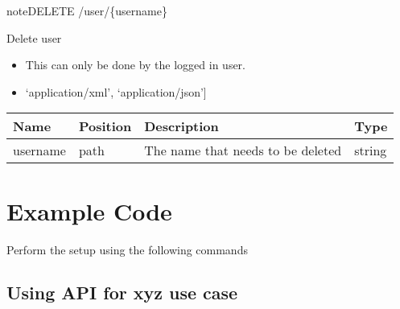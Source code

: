 \documentclass[letterpaper,10pt,english]{sphinxmanual}
\begin{document}
\begin{sphinxadmonition}{note}{DELETE /user/\{username\}}

Delete user\begin{itemize}
\item {} 
This can only be done by the logged in user.

\item {} 
\sphinxstylestrong{Produces: 
}{[}‘application/xml’, ‘application/json’{]}

\end{itemize}




\begin{savenotes}\sphinxattablestart
\centering
\begin{tabulary}{\linewidth}[t]{|T|T|T|T|}
\hline
\sphinxstyletheadfamily 
Name
&\sphinxstyletheadfamily 
Position
&\sphinxstyletheadfamily 
Description
&\sphinxstyletheadfamily 
Type
\\
\hline
username
&
path
&
The name that needs to be deleted
&
string
\\
\hline
\end{tabulary}
\par
\sphinxattableend\end{savenotes}



\end{sphinxadmonition}


\section{Example Code}
\label{\detokenize{dev-guide:example-code}}
Perform the setup using the following commands

\begin{sphinxVerbatim}[commandchars=\\\{\}]
       
\end{sphinxVerbatim}


\subsection{Using API for xyz use case}
\label{\detokenize{dev-guide:using-api-for-xyz-use-case}}
\end{document}

